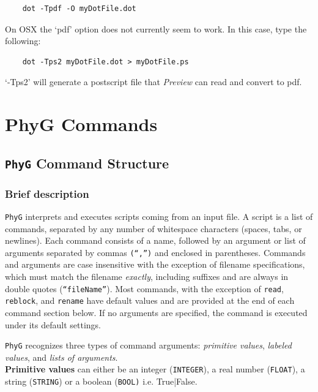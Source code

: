 \documentclass[11pt]{book}
\newcommand{\phyg}{\texttt{PhyG} }
\begin{document}
{{	\begin{verbatim}
	dot -Tpdf -O myDotFile.dot
	\end{verbatim}
		
	On OSX the `pdf' option does not currently seem to work. In this case, type the 
	following:

	\begin{verbatim}
	dot -Tps2 myDotFile.dot > myDotFile.ps
	\end{verbatim}
	
	`-Tps2' will generate a postscript file that \textit{Preview} can read and 
	convert to pdf.

	
\chapter{PhyG Commands}

\section{\phyg Command Structure}
		
	\subsection{Brief description}
		\phyg interprets and executes scripts coming from an input file. A script is a list of 
		commands, separated by any number of whitespace characters (spaces, tabs, or 
		newlines). Each command consists of a name, followed by an argument or list of 
		arguments separated by commas \texttt{(``,'')} and enclosed in parentheses. 
		Commands and arguments are case insensitive with the exception of filename 
		specifications, which must match the filename \textit{exactly}, including suffixes 
		and are always in double quotes (\texttt{``fileName''}). Most commands, with the 
		exception of \texttt{read}, \texttt{reblock}, and \texttt{rename} have default values 
		and are provided at the end of each command section below. If no arguments are 
		specified, the command is executed under its default settings.
		
		\phyg recognizes three types of command arguments: \textit{primitive values}, 
		\textit{labeled values}, and \textit{lists of arguments}.\\
		
		\noindent \textbf{Primitive values} can either be an integer (\texttt{INTEGER}), 
		a real number (\texttt{FLOAT}), a string (\texttt{STRING}) or a boolean (\texttt{BOOL)} 
		i.e. True|False. \\
		
}}
\end{document}
